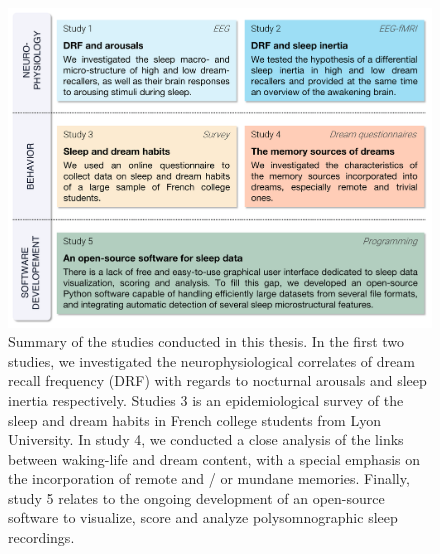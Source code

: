 \begin{figure}[htb]
	\includegraphics[width=\textwidth]{Fig/Intro/Intro_Problematics/Intro_Problematics.png}
	\caption[Summary of the studies conducted in this thesis]{Summary of the studies conducted in this thesis. In the first two studies, we investigated the neurophysiological correlates of dream recall frequency (DRF) with regards to nocturnal arousals and sleep inertia respectively. Studies 3 is an epidemiological survey of the sleep and dream habits in French college students from Lyon University. In study 4, we conducted a close analysis of the links between waking-life and dream content, with a special emphasis on the incorporation of remote and / or mundane memories. Finally, study 5 relates to the ongoing development of an open-source software to visualize, score and analyze polysomnographic sleep recordings.}
	\label{fig:intro:problematics-summary}
\end{figure}
